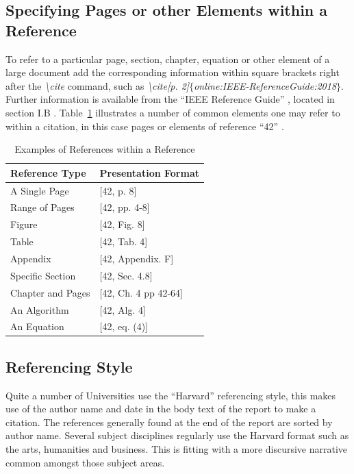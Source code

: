 \subsection{Specifying Pages or other Elements within a Reference}
To refer to a particular page, section, chapter, equation or other element of a large document add the corresponding information within square brackets right after the \emph{\textbackslash cite} command, such as \emph{\textbackslash cite[p. 2]$\{$online:IEEE-ReferenceGuide:2018$\}$}. Further information is available from the ``IEEE Reference Guide'' \cite[p.3]{online:IEEE-ReferenceGuide:2018}, located in section I.B \cite[Sec I.B]{online:IEEE-ReferenceGuide:2018}. Table~\ref{tab:ReferenceExamples} illustrates a number of common elements one may refer to within a citation, in this case pages or elements of reference ``42'' \cite[Ch. 27]{book:Adams:1979}.

\begin{table}[H]
\caption{Examples of References within a Reference}\label{tab:ReferenceExamples}
\centering
\small
\begin{tabular}{ll}
\toprule \textbf{Reference Type}& \textbf{Presentation Format}\\
\midrule
A Single Page & [42, p. 8] \\
Range of Pages & [42, pp. 4-8] \\
Figure & [42, Fig. 8] \\
Table & [42, Tab. 4] \\
Appendix & [42, Appendix. F] \\
Specific Section & [42, Sec. 4.8] \\
Chapter and Pages & [42, Ch. 4 pp 42-64] \\
An Algorithm & [42, Alg. 4] \\
An Equation & [42, eq. (4)] \\
\bottomrule
\end{tabular}
\end{table}

\subsection{Referencing Style}
Quite a number of Universities use the ``Harvard'' referencing style, this makes use of the author name and date in the body text of the report to make a citation. The references generally found at the end of the report are sorted by author name. Several subject disciplines regularly use the Harvard format such as the arts, humanities and business. This is fitting with a more discursive narrative common amongst those subject areas. 

